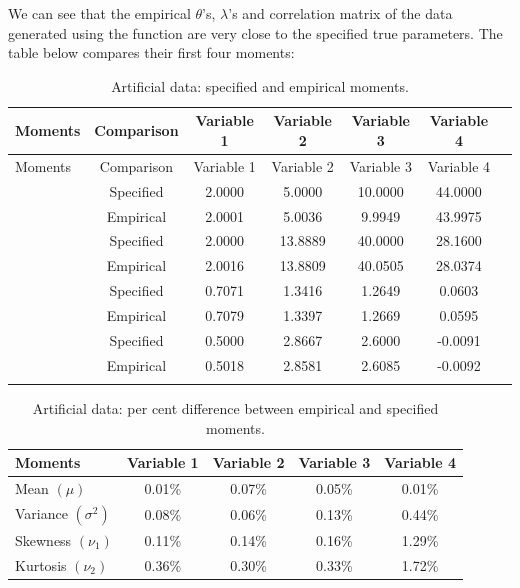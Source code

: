 We can see that the empirical $\theta$'s, $\lambda$'s and correlation matrix of the data generated using the  function are very close to the specified true parameters. The table below
compares their first four moments:

\begin{longtable}[c]{lcccccc}
\caption{Artificial data: specified and empirical moments.} \\
\toprule
Moments & Comparison & Variable 1 & Variable 2 & Variable 3 & Variable 4 
\\ [0.5ex]
\midrule
\endfirsthead
\toprule
Moments & Comparison & Variable 1 & Variable 2 & Variable 3 & Variable 4 
\\ [0.5ex]
\midrule
\endhead
&Specified & 2.0000 & 5.0000 & 10.0000 & 44.0000 & \\[-1ex]
\raisebox{1.5ex}{Mean$(\mu)$} 
&Empirical & 2.0001 & 5.0036 & 9.9949 & 43.9975  \\
[0.5ex]\midrule
&Specified & 2.0000 & 13.8889 & 40.0000 & 28.1600  \\[-1ex]
\raisebox{1.5ex}{Variance$(\sigma^2)$} 
&Empirical & 2.0016 & 13.8809 & 40.0505 & 28.0374 \\
[0.5ex]\midrule
&Specified & 0.7071 & 1.3416 & 1.2649 & 0.0603 \\[-1ex]
\raisebox{1.5ex}{Skewness$(\nu_1)$} 
&Empirical & 0.7079 & 1.3397 & 1.2669 & 0.0595  \\
[0.5ex]\midrule
&Specified & 0.5000 & 2.8667 & 2.6000 & -0.0091  \\[-1ex]
\raisebox{1.5ex}{Kurtosis$(\nu_2)$} 
&Empirical & 0.5018 & 2.8581 & 2.6085 & -0.0092 \\[0.5ex]
\bottomrule
\label{tab:tb5}
\end{longtable}

\begin{table}[ht]
\caption{Artificial data: per cent difference between empirical and specified moments.} 
\centering 
\begin{tabularx}{0.75\linewidth}{lcccc} 
\toprule
Moments  & Variable 1 & Variable 2 & Variable 3 & Variable 4 \\ [0.5ex] 
\midrule
Mean $(\mu)$          &0.01\% &0.07\% &0.05\% &0.01\%\\
Variance $(\sigma^2)$ &0.08\% &0.06\% &0.13\% &0.44\%\\
Skewness $(\nu_1)$    &0.11\% &0.14\% &0.16\% &1.29\%\\
Kurtosis $(\nu_2)$    &0.36\% &0.30\% &0.33\% &1.72\%\\
\bottomrule
\end{tabularx}
\label{t-5b} 
\end{table}

